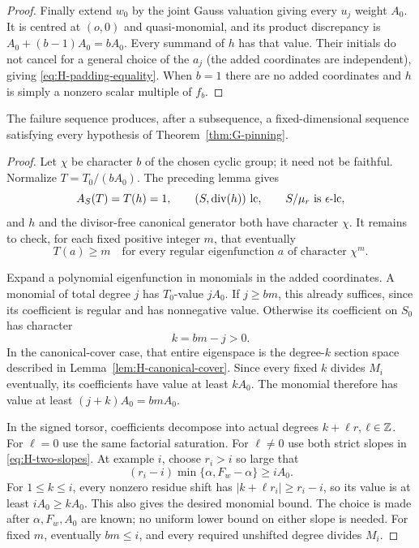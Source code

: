 \begin{proof}
Finally extend $w_0$ by the joint Gauss valuation giving every $u_j$
weight $A_0$.  It is centred at $(o,0)$ and quasi-monomial, and its
product discrepancy is $A_0+(b-1)A_0=bA_0$.  Every summand of $h$ has
that value.  Their initials do not cancel for a general choice of the
$a_j$ (the added coordinates are independent), giving
\eqref{eq:H-padding-equality}.  When $b=1$ there are no added
coordinates and $h$ is simply a nonzero scalar multiple of $f_b$.
\end{proof}

\begin{proposition}\label{prop:H-g-input}
The failure sequence produces, after a subsequence, a fixed-dimensional
sequence satisfying every hypothesis of Theorem~\ref{thm:G-pinning}.
\end{proposition}
\begin{proof}
Let $\chi$ be character $b$ of the chosen cyclic group; it need not be
faithful.  Normalize $T=T_0/(bA_0)$.  The preceding lemma gives
\[
 A_S(T)=T(h)=1,
 \qquad (S,\operatorname{div}(h))\text{ lc},
 \qquad S/\mu_r\text{ is }\epsilon\text{-lc},
\]
and $h$ and the divisor-free canonical generator both have character
$\chi$.  It remains to check, for each fixed positive integer $m$, that
eventually
\begin{equation}\label{eq:H-final-saturation}
 T(a)\ge m
 \quad\text{for every regular eigenfunction }a\text{ of character }\chi^m.
\end{equation}

Expand a polynomial eigenfunction in monomials in the added coordinates.
A monomial of total degree $j$ has $T_0$-value $jA_0$.  If $j\ge bm$,
this already suffices, since its coefficient is regular and has
nonnegative value.  Otherwise its coefficient on $S_0$ has character
\[
 k=bm-j>0.
\]
In the canonical-cover case, that entire eigenspace is the degree-$k$
section space described in Lemma~\ref{lem:H-canonical-cover}.  Since
every fixed $k$ divides $M_i$ eventually, its coefficients have value
at least $kA_0$.  The monomial therefore has value at least
$(j+k)A_0=bmA_0$.

In the signed torsor, coefficients decompose into actual degrees
$k+\ell r$, $\ell\in\mathbb Z$.  For $\ell=0$ use the same factorial
saturation.  For $\ell\ne0$ use both strict slopes in
\eqref{eq:H-two-slopes}.  At example $i$, choose $r_i>i$ so large that
\begin{equation}\label{eq:H-cyclic-order}
 (r_i-i)\min\{\alpha,F_w-\alpha\}\ge iA_0.
\end{equation}
For $1\le k\le i$, every nonzero residue shift has
$|k+\ell r_i|\ge r_i-i$, so its value is at least $iA_0\ge kA_0$.
This also gives the desired monomial bound.  The choice is made after
$\alpha,F_w,A_0$ are known; no uniform lower bound on either slope is
needed.  For fixed $m$, eventually $bm\le i$, and every required
unshifted degree divides $M_i$.


\end{proof}
